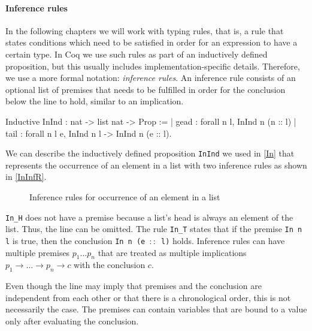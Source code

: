 \documentclass[paper = a4, fleqn, abstract=on, twoside]{scrreprt}
\newcommand{\todo}[1]{\marginpar{\textbf{TODO:} #1}}
\newcommand{\coqinline}[1]{\texttt{#1}}
\begin{document}
\paragraph{Inference rules}
In the following chapters we will work with typing rules, that is, a rule that states conditions which need to be satisfied in order for an expression to have a certain type. In Coq we use such rules as part of an inductively defined proposition, but this usually includes implementation-specific details. Therefore, we use a more formal notation: \textit{inference rules}.\label{infrules} An inference rule consists of an optional list of premises that needs to be fulfilled in order for the conclusion below the line to hold, similar to an implication.
\begin{coqcode}
Inductive InInd : nat -> list nat -> Prop :=
  | gead : forall n l, InInd n (n :: l)
  | tail : forall n l e, InInd n l -> InInd n (e :: l).
\end{coqcode}
We can describe the inductively defined proposition \coqinline{InInd} we used in \autoref{In} that represents the occurrence of an element in a list with two inference rules as shown in \autoref{InInfR}.
\begin{figure}[H]
	\begin{center}
		\begin{minipage}{.45 \linewidth}
			\infer[\text{\texttt{In\_H}}]{\coqinline{In n (n :: l)}}{\phantom{premise}}
		\end{minipage}
		\hspace{.1 \linewidth}
		\begin{minipage}{.45 \linewidth}
			\infer[\text{\texttt{In\_T}}]{\coqinline{In n (e :: l)}}{\coqinline{In n l}}
		\end{minipage}
	\end{center}
	\caption{Inference rules for occurrence of an element in a list}
	\label{InInfR}
\end{figure} \noindent
\texttt{In\_H} does not have a premise because a list's head is always an element of the list. Thus, the line can be omitted. The rule \texttt{In\_T} states that if the premise \texttt{In n l} is true, then the conclusion \texttt{In n (e $::$ l)} holds.
Inference rules can have multiple premises $p_1 \dots p_n$ that are treated as multiple implications $p_1 \rightarrow \dots \rightarrow p_n \rightarrow c$ with the conclusion $c$.
\par
Even though the line may imply that premises and the conclusion are independent from each other or that there is a chronological order, this is not necessarily the case. The premises can contain variables that are bound to a value only after evaluating the conclusion. \todo{Beispiel}
\end{document}
